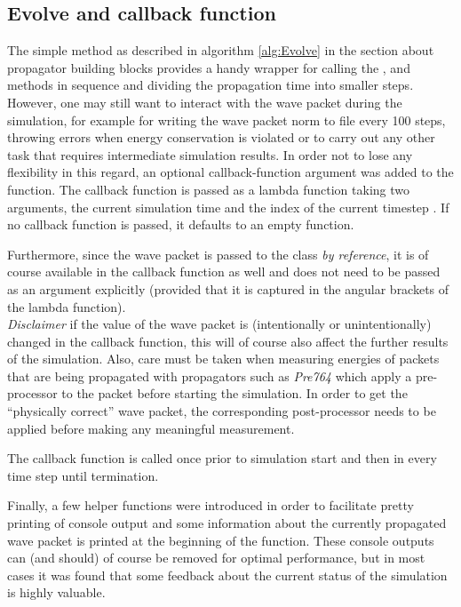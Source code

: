 \subsection{Evolve and callback function}
\label{subsec:callback}
%
The simple  method as described in algorithm \ref{alg:Evolve} in the section about propagator building blocks provides a handy wrapper for calling the ,  and  methods in sequence and dividing the propagation time into smaller steps. \\
%
However, one may still want to interact with the wave packet during the simulation, for example for writing the wave packet norm to file every 100 steps, throwing errors when energy conservation is violated or to carry out any other task that requires intermediate simulation results.
In order not to lose any flexibility in this regard, an optional callback-function argument was added to the  function.
The callback function is passed as a lambda function taking two arguments, the current simulation time  and the index of the current timestep .
If no callback function is passed, it defaults to an empty function.
\par\medskip
%
Furthermore, since the wave packet is passed to the  class \emph{by reference}, it is of course available in the callback function as well and does not need to be passed as an argument explicitly (provided that it is captured in the angular brackets \proc{[]} of the lambda function). \\
\emph{Disclaimer} if the value of the wave packet is (intentionally or unintentionally) changed in the callback function, this will of course also affect the further results of the simulation.
Also, care must be taken when measuring energies of packets that are being propagated with propagators such as \emph{Pre764} which apply a pre-processor to the packet before starting the simulation.
In order to get the ``physically correct'' wave packet, the corresponding post-processor needs to be applied before making any meaningful measurement.
\par\medskip
%
The callback function is called once prior to simulation start and then in every time step until termination.
\par\medskip
%
Finally, a few helper functions were introduced in order to facilitate pretty printing of console output and some information about the currently propagated wave packet is printed at the beginning of the  function.
These console outputs can (and should) of course be removed for optimal performance, but in most cases it was found that some feedback about the current status of the simulation is highly valuable.


